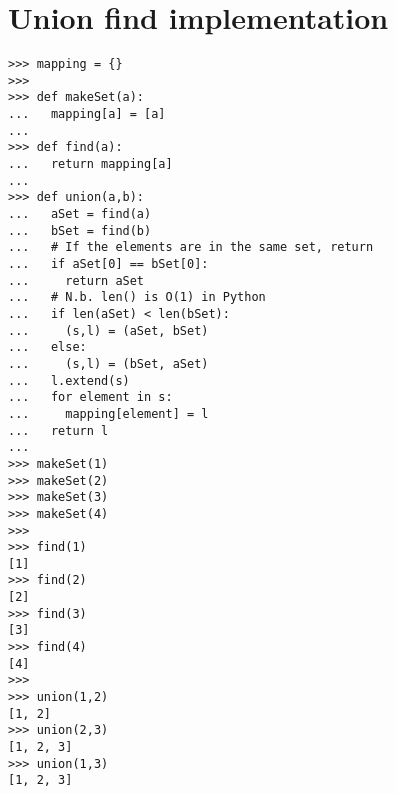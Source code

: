 \section{Union find implementation}
\label{sec:unionfindimpl}

\begin{verbatim}
>>> mapping = {}
>>> 
>>> def makeSet(a):
...   mapping[a] = [a]
... 
>>> def find(a):
...   return mapping[a]
... 
>>> def union(a,b):
...   aSet = find(a)
...   bSet = find(b)
...   # If the elements are in the same set, return
...   if aSet[0] == bSet[0]:
...     return aSet
...   # N.b. len() is O(1) in Python
...   if len(aSet) < len(bSet):
...     (s,l) = (aSet, bSet)
...   else:
...     (s,l) = (bSet, aSet)
...   l.extend(s)
...   for element in s:
...     mapping[element] = l
...   return l
... 
>>> makeSet(1)
>>> makeSet(2)
>>> makeSet(3)
>>> makeSet(4)
>>> 
>>> find(1)
[1]
>>> find(2)
[2]
>>> find(3)
[3]
>>> find(4)
[4]
>>> 
>>> union(1,2)
[1, 2]
>>> union(2,3)
[1, 2, 3]
>>> union(1,3)
[1, 2, 3]
\end{verbatim}
